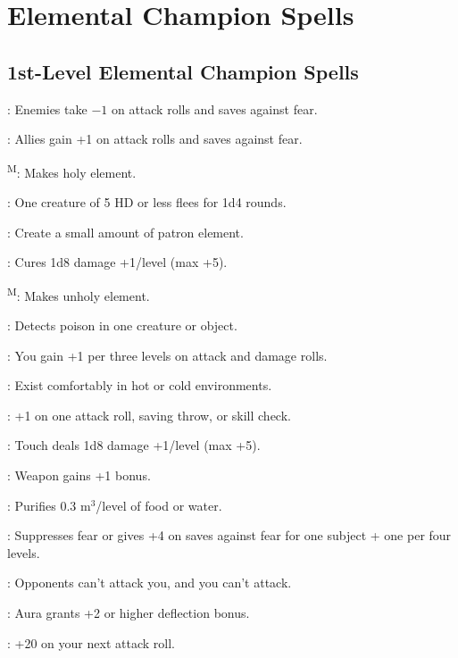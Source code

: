 \section{Elemental Champion Spells}




\subsection{1st-Level Elemental Champion Spells}

: Enemies take $-1$ on attack rolls and saves against fear.

: Allies gain +1 on attack rolls and saves against fear.

\textsuperscript{M}: Makes holy element. %

: One creature of 5 HD or less flees for 1d4 rounds.

: Create a small amount of patron element. %

: Cures 1d8 damage +1/level (max +5).

\textsuperscript{M}: Makes unholy element. %

: Detects poison in one creature or object.

: You gain +1 per three levels on attack and damage rolls.

: Exist comfortably in hot or cold environments.

: +1 on one attack roll, saving throw, or skill check.

: Touch deals 1d8 damage +1/level (max +5).

: Weapon gains +1 bonus.

: Purifies 0.3 m$^3$/level of food or water.

: Suppresses fear or gives +4 on saves against fear for one subject + one per four levels.

: Opponents can't attack you, and you can't attack.

: Aura grants +2 or higher deflection bonus.

: +20 on your next attack roll.




